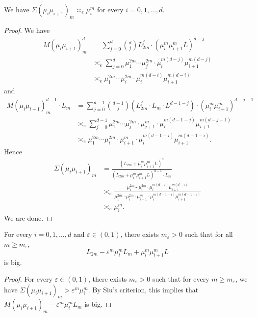   \begin{lemma}\label{lemma:estimation_of_Sigma}
    We have $\Sigma(\mu_i\mu_{i+1})_m \asymp_e \mu_i^m$ for every $i = 0, 1, \ldots, d$.
  \end{lemma}
  \begin{proof}
    We have 
    \begin{align*}
      M(\mu_i \mu_{i+1})_m^d & = \sum_{j=0}^{d} \binom{d}{j} L_{2m}^{j} \cdot (\mu_i^m \mu_{i+1}^m L)^{d-j} \\
      & \asymp_e \sum_{j=0}^{d} \mu_1^{2m} \cdots \mu_j^{2m} \cdot \mu_i^{m(d-j)} \mu_{i+1}^{m(d-j)} \\
      & \asymp_e \mu_1^{2m} \cdots \mu_i^{2m} \cdot \mu_{i}^{m(d-i)} \mu_{i+1}^{m(d-i)}
    \end{align*}
    and 
    \begin{align*}
      M(\mu_i \mu_{i+1})_m^{d-1} \cdot L_m & = \sum_{j=0}^{d-1} \binom{d-1}{j} \left(L_{2m}^{j} \cdot L_m \cdot L^{d-1-j} \right) \cdot (\mu_i^m \mu_{i+1}^m)^{d-j-1}\\
      & \asymp_e \sum_{j=0}^{d-1} \mu_1^{2m} \cdots \mu_j^{2m} \cdot \mu_{j+1}^m \cdot \mu_i^{m(d-1-j)} \mu_{i+1}^{m(d-j-1)} \\
      & \asymp_e \mu_1^{2m} \cdots \mu_{i}^{2m} \cdot \mu_{i+1}^m \cdot \mu_i^{m(d-1-i)} \mu_{i+1}^{m(d-1-i)}.
    \end{align*}
    Hence
    \begin{align*}
      \Sigma(\mu_i\mu_{i+1})_m & = \frac{(L_{2m} + \mu_i^m \mu_{i+1}^m L)^{d}}{(L_{2m} + \mu_i^m \mu_{i+1}^m L)^{d-1} \cdot L_m} \\
      & \asymp_e \frac{\mu_1^{2m} \cdots \mu_i^{2m} \cdot \mu_{i}^{m(d-i)} \mu_{i+1}^{m(d-i)}}{\mu_1^{2m} \cdots \mu_{i}^{2m} \cdot \mu_{i+1}^m \cdot \mu_i^{m(d-1-i)} \mu_{i+1}^{m(d-1-i)}} \\
      & \asymp_e \mu_i^m.
    \end{align*}
    We are done.
  \end{proof}

  \begin{theorem}\label{thm:big_inequality_by_mu_i}
    For every $i = 0, 1, \ldots, d$ and $\varepsilon \in (0, 1)$, there exists $m_\varepsilon > 0$ such that for all $m \geq m_\varepsilon$,
    \[  L_{2m} - \varepsilon^m \mu_i^m L_m + \mu_i^m \mu_{i+1}^m L \]
    is big.
  \end{theorem}
  \begin{proof}
    For every $\varepsilon \in (0, 1)$, there exists $m_\varepsilon > 0$ such that for every $m \geq m_\varepsilon$, we have $\Sigma(\mu_i \mu_{i+1})_m > \varepsilon^m \mu_i^m$.
    By Siu's criterion, this implies that $M(\mu_i \mu_{i+1})_m - \varepsilon^m \mu_i^m L_m$ is big.
  \end{proof}



